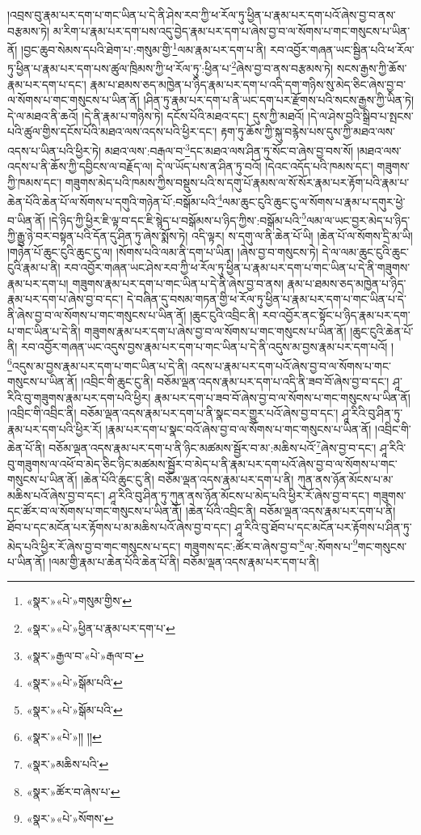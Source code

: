 །འབྲས་བུ་རྣམ་པར་དག་པ་གང་ཡིན་པ་དེ་ནི་ཤེས་རབ་ཀྱི་ཕ་རོལ་ཏུ་ཕྱིན་པ་རྣམ་པར་དག་པའོ་ཞེས་བྱ་བ་ནས་བརྩམས་ཏེ། མ་རིག་པ་རྣམ་པར་དག་པས་འདུ་བྱེད་རྣམ་པར་དག་པ་ཞེས་བྱ་བ་ལ་སོགས་པ་གང་གསུངས་པ་ཡིན་ནོ། །བྱང་ཆུབ་སེམས་དཔའི་ཐེག་པ་:གསུམ་གྱི་\footnote{«སྣར་»«པེ་»གསུམ་གྱིས་}ལམ་རྣམ་པར་དག་པ་ནི། རབ་འབྱོར་གཞན་ཡང་སྦྱིན་པའི་ཕ་རོལ་ཏུ་ཕྱིན་པ་རྣམ་པར་དག་པས་ཚུལ་ཁྲིམས་ཀྱི་ཕ་རོལ་ཏུ་:ཕྱིན་པ་\footnote{«སྣར་»«པེ་»ཕྱིན་པ་རྣམ་པར་དག་པ་}ཞེས་བྱ་བ་ནས་བརྩམས་ཏེ། སངས་རྒྱས་ཀྱི་ཆོས་རྣམ་པར་དག་པ་དང་། རྣམ་པ་ཐམས་ཅད་མཁྱེན་པ་ཉིད་རྣམ་པར་དག་པ་འདི་དག་གཉིས་སུ་མེད་ཅིང་ཞེས་བྱ་བ་ལ་སོགས་པ་གང་གསུངས་པ་ཡིན་ནོ། །ཤིན་ཏུ་རྣམ་པར་དག་པ་ནི་ཡང་དག་པར་རྫོགས་པའི་སངས་རྒྱས་ཀྱི་ཡིན་ཏེ། དེ་ལ་མཐའ་ནི་ཆའོ། །དེ་ནི་རྣམ་པ་གཉིས་ཏེ། དངོས་པོའི་མཐའ་དང་། དུས་ཀྱི་མཐའོ། །དེ་ལ་ཤེས་བྱའི་སྒྲིབ་པ་སྤངས་པའི་ཚུལ་གྱིས་དངོས་པོའི་མཐའ་ལས་འདས་པའི་ཕྱིར་དང་། རྟག་ཏུ་ཆོས་ཀྱི་སྐུ་བརྙེས་པས་དུས་ཀྱི་མཐའ་ལས་འདས་པ་ཡིན་པའི་ཕྱིར་ཏེ། མཐའ་ལས་:བརྒལ་བ་\footnote{«སྣར་»རྒྱལ་བ་«པེ་»རྒལ་བ་}དང་མཐའ་ལས་ཤིན་ཏུ་སོང་བ་ཞེས་བྱ་བས་སོ། །མཐའ་ལས་འདས་པ་ནི་ཆོས་ཀྱི་དབྱིངས་ལ་བརྗོད་ལ། དེ་ལ་ཡོད་པས་ན་ཤིན་ཏུ་བའོ། །དེའང་འདོད་པའི་ཁམས་དང་། གཟུགས་ཀྱི་ཁམས་དང་། གཟུགས་མེད་པའི་ཁམས་ཀྱིས་བསྡུས་པའི་ས་དགུ་པོ་རྣམས་ལ་སོ་སོར་རྣམ་པར་རྟོག་པའི་རྣམ་པ་ཆེན་པོའི་ཆེན་པོ་ལ་སོགས་པ་དགུའི་གཉེན་པོ་:བསྒོམ་པའི་\footnote{«སྣར་»«པེ་»སྒོམ་པའི་}ལམ་ཆུང་ངུའི་ཆུང་ངུ་ལ་སོགས་པ་རྣམ་པ་དགུར་ཕྱེ་བ་ཡིན་ནོ། །དེ་ཉིད་ཀྱི་ཕྱིར་ཇི་ལྟ་བ་དང་ཇི་སྙེད་པ་བསྒོམས་པ་ཉིད་ཀྱིས་:བསྒོམ་པའི་\footnote{«སྣར་»«པེ་»སྒོམ་པའི་}ལམ་ལ་ཡང་བྱར་མེད་པ་ཉིད་ཀྱི་རྒྱུ་ཉེ་བར་བསྟན་པའི་དོན་དུ་ཤིན་ཏུ་ཞེས་སྨོས་ཏེ། འདི་ལྟར། ས་དགུ་ལ་ནི་ཆེན་པོ་ཡི། །ཆེན་པོ་ལ་སོགས་དྲི་མ་ཡི། །གཉེན་པོ་ཆུང་ངུའི་ཆུང་ངུ་ལ། །སོགས་པའི་ལམ་ནི་དག་པ་ཡིན། །ཞེས་བྱ་བ་གསུངས་ཏེ། དེ་ལ་ལམ་ཆུང་ངུའི་ཆུང་ངུའི་རྣམ་པ་ནི། རབ་འབྱོར་གཞན་ཡང་ཤེས་རབ་ཀྱི་ཕ་རོལ་ཏུ་ཕྱིན་པ་རྣམ་པར་དག་པ་གང་ཡིན་པ་དེ་ནི་གཟུགས་རྣམ་པར་དག་པ། གཟུགས་རྣམ་པར་དག་པ་གང་ཡིན་པ་དེ་ནི་ཞེས་བྱ་བ་ནས། རྣམ་པ་ཐམས་ཅད་མཁྱེན་པ་ཉིད་རྣམ་པར་དག་པ་ཞེས་བྱ་བ་དང་། དེ་བཞིན་དུ་བསམ་གཏན་གྱི་ཕ་རོལ་ཏུ་ཕྱིན་པ་རྣམ་པར་དག་པ་གང་ཡིན་པ་དེ་ནི་ཞེས་བྱ་བ་ལ་སོགས་པ་གང་གསུངས་པ་ཡིན་ནོ། །ཆུང་ངུའི་འབྲིང་ནི། རབ་འབྱོར་ནང་སྟོང་པ་ཉིད་རྣམ་པར་དག་པ་གང་ཡིན་པ་དེ་ནི། གཟུགས་རྣམ་པར་དག་པ་ཞེས་བྱ་བ་ལ་སོགས་པ་གང་གསུངས་པ་ཡིན་ནོ། །ཆུང་ངུའི་ཆེན་པོ་ནི། རབ་འབྱོར་གཞན་ཡང་འདུས་བྱས་རྣམ་པར་དག་པ་གང་ཡིན་པ་དེ་ནི་འདུས་མ་བྱས་རྣམ་པར་དག་པའོ། །\footnote{«སྣར་»«པེ་»།། །།}འདུས་མ་བྱས་རྣམ་པར་དག་པ་གང་ཡིན་པ་དེ་ནི། འདས་པ་རྣམ་པར་དག་པའོ་ཞེས་བྱ་བ་ལ་སོགས་པ་གང་གསུངས་པ་ཡིན་ནོ། །འབྲིང་གི་ཆུང་ངུ་ནི། བཅོམ་ལྡན་འདས་རྣམ་པར་དག་པ་འདི་ནི་ཟབ་བོ་ཞེས་བྱ་བ་དང་། ཤཱ་རིའི་བུ་གཟུགས་རྣམ་པར་དག་པའི་ཕྱིར། རྣམ་པར་དག་པ་ཟབ་བོ་ཞེས་བྱ་བ་ལ་སོགས་པ་གང་གསུངས་པ་ཡིན་ནོ། །འབྲིང་གི་འབྲིང་ནི། བཅོམ་ལྡན་འདས་རྣམ་པར་དག་པ་ནི་སྣང་བར་གྱུར་པའོ་ཞེས་བྱ་བ་དང་། ཤཱ་རིའི་བུ་ཤིན་ཏུ་རྣམ་པར་དག་པའི་ཕྱིར་རོ། །རྣམ་པར་དག་པ་སྣང་བའོ་ཞེས་བྱ་བ་ལ་སོགས་པ་གང་གསུངས་པ་ཡིན་ནོ། །འབྲིང་གི་ཆེན་པོ་ནི། བཅོམ་ལྡན་འདས་རྣམ་པར་དག་པ་ནི་ཉིང་མཚམས་སྦྱོར་བ་མ་:མཆིས་པའོ་\footnote{«སྣར་»མཆིས་པའི་}ཞེས་བྱ་བ་དང་། ཤཱ་རིའི་བུ་གཟུགས་ལ་འཕོ་བ་མེད་ཅིང་ཉིང་མཚམས་སྦྱོར་བ་མེད་པ་ནི་རྣམ་པར་དག་པའོ་ཞེས་བྱ་བ་ལ་སོགས་པ་གང་གསུངས་པ་ཡིན་ནོ། །ཆེན་པོའི་ཆུང་ངུ་ནི། བཅོམ་ལྡན་འདས་རྣམ་པར་དག་པ་ནི། ཀུན་ནས་ཉོན་མོངས་པ་མ་མཆིས་པའོ་ཞེས་བྱ་བ་དང་། ཤཱ་རིའི་བུ་ཤིན་ཏུ་ཀུན་ནས་ཉོན་མོངས་པ་མེད་པའི་ཕྱིར་རོ་ཞེས་བྱ་བ་དང་། གཟུགས་དང་ཚོར་བ་ལ་སོགས་པ་གང་གསུངས་པ་ཡིན་ནོ། །ཆེན་པོའི་འབྲིང་ནི། བཅོམ་ལྡན་འདས་རྣམ་པར་དག་པ་ནི། ཐོབ་པ་དང་མངོན་པར་རྟོགས་པ་མ་མཆིས་པའོ་ཞེས་བྱ་བ་དང་། ཤཱ་རིའི་བུ་ཐོབ་པ་དང་མངོན་པར་རྟོགས་པ་ཤིན་ཏུ་མེད་པའི་ཕྱིར་རོ་ཞེས་བྱ་བ་གང་གསུངས་པ་དང་། གཟུགས་དང་:ཚོར་བ་ཞེས་བྱ་བ་\footnote{«སྣར་»ཚོར་བ་ཞེས་པ་}ལ་:སོགས་པ་\footnote{«སྣར་»«པེ་»སོགས་}གང་གསུངས་པ་ཡིན་ནོ། །ལམ་གྱི་རྣམ་པ་ཆེན་པོའི་ཆེན་པོ་ནི། བཅོམ་ལྡན་འདས་རྣམ་པར་དག་པ་ནི། 